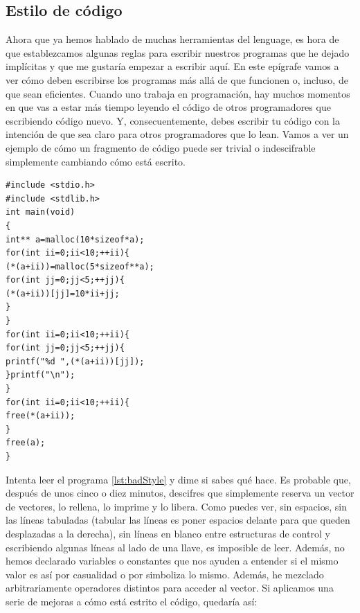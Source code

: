 \documentclass[a4paper]{article}
\begin{document}
\subsection{Estilo de código}
Ahora que ya hemos hablado de muchas herramientas del lenguage, es hora de que
establezcamos algunas reglas para escribir nuestros programas que he dejado
implícitas y que me gustaría empezar a escribir aquí. En este epígrafe vamos
a ver cómo deben escribirse los programas más allá de que funcionen o, incluso,
de que sean eficientes. Cuando uno trabaja en programación, hay muchos momentos
en que vas a estar más tiempo leyendo el código de otros programadores que
escribiendo código nuevo. Y, consecuentemente, debes escribir tu código con la
intención de que sea claro para otros programadores que lo lean. Vamos a ver
un ejemplo de cómo un fragmento de código puede ser trivial o indescifrable
simplemente cambiando cómo está escrito.

\noindent
\begin{minipage}[H]{\linewidth}
\mbox{}
\begin{lstlisting}[style=C,
caption={Ejemplo de programa escrito con un mal estilo},
label={lst:badStyle}]
#include <stdio.h>
#include <stdlib.h>
int main(void)
{
int** a=malloc(10*sizeof*a);
for(int ii=0;ii<10;++ii){
(*(a+ii))=malloc(5*sizeof**a);
for(int jj=0;jj<5;++jj){
(*(a+ii))[jj]=10*ii+jj;
}
}
for(int ii=0;ii<10;++ii){
for(int jj=0;jj<5;++jj){
printf("%d ",(*(a+ii))[jj]);
}printf("\n");
}
for(int ii=0;ii<10;++ii){
free(*(a+ii));
}
free(a);
}
\end{lstlisting}
\end{minipage}

Intenta leer el programa \ref{lst:badStyle} y dime si sabes qué hace. Es probable
que, después de unos cinco o diez minutos, descifres que simplemente reserva un
vector de vectores, lo rellena, lo imprime y lo libera. Como puedes ver, sin
espacios, sin las líneas tabuladas (tabular las líneas es poner espacios delante
para que queden desplazadas a la derecha), sin líneas en blanco entre
estructuras de control y escribiendo algunas líneas al lado de una llave,
es imposible de
leer. Además, no hemos declarado variables o constantes que nos ayuden a
entender si el mismo valor es así por casualidad o por simboliza lo mismo.
Además, he mezclado arbitrariamente operadores distintos para acceder al vector.
Si aplicamos una serie de mejoras a cómo está estrito el código, quedaría así:
\end{document}
